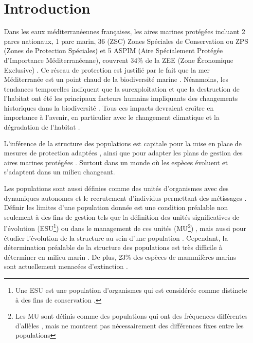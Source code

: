 \documentclass[a4paper,12pt,twoside]{article}\usepackage[]{graphicx}\usepackage[]{color}
\begin{document}
\newpage

\section{Introduction}

Dans les eaux méditerranéennes françaises, les aires marines protégées incluant 2 parcs nationaux, 1 parc marin, 36 (ZSC) Zones Spéciales de Conservation ou ZPS (Zones de Protection Spéciales) et 5 ASPIM (Aire Spécialement Protégée d’Importance Méditerranéenne), couvrent 34\% de la ZEE (Zone Économique Exclusive) \citep{workshop}. Ce réseau de protection est justifié par le fait que la mer Méditerranée est un point chaud de la biodiversité marine \citep{coll2010biodiversity}. Néanmoins, les tendances temporelles indiquent que la surexploitation et que la destruction de l'habitat ont été les principaux facteurs humains impliquants des changements historiques dans la biodiversité \citep{danovaro2003pollution, coll2010biodiversity}. Tous ces impacts devraient croître en importance à l'avenir, en particulier avec le changement climatique et la dégradation de l'habitat \citep{coll2012mediterranean}. 

L’inférence de la structure des populations est capitale pour la mise en place de mesures de protection adaptées \citep{hoelzel1998genetic}, ainsi que pour adapter les plans de gestion des aires marines protégées \citep{MPA}. Surtout dans un monde où les espèces évoluent et s'adaptent dans un milieu changeant.

Les populations sont aussi définies comme des unités d'organismes avec des dynamiques autonomes et le recrutement d'individus permettant des métissages \citep{krutzen2004population}. Définir les limites d'une population donnée est une condition préalable non seulement à des fins de gestion tels que la définition des unités significatives de l'évolution (ESU\footnote{Une ESU est une population d'organismes qui est considérée comme distincte à des fins de conservation .}) \citep{hoelzel1998genetic, carnabuci2016} ou dans le management de ces unités (MU\footnote{Les MU sont définis comme des populations qui ont des fréquences différentes d'allèles , mais ne montrent pas nécessairement des différences fixes entre les populations}) \citep{ryder1986species, hawkins2016fisheries}, mais aussi pour étudier l'évolution de la structure au sein d'une population \citep{carnabuci2016}. Cependant, la détermination préalable de la structure des populations est très difficile à déterminer en milieu marin \citep{Jonsson2016}. De plus, 23\% des espèces de mammifères marins sont actuellement menacées d’extinction \citep{schipper2008status}. 
\end{document}
